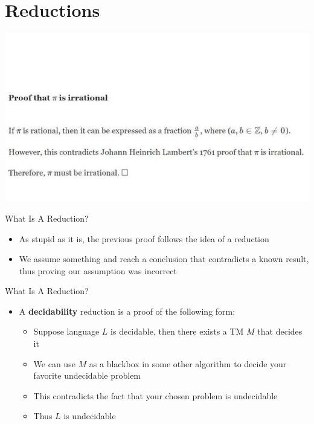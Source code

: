 \documentclass[aspectratio=169]{beamer}
\begin{document}
\section{Reductions}
\frame{\sectionpage}

\begin{frame}
  \begin{center}
    \includegraphics[width=\textwidth]{images/pi_proof.jpg}
  \end{center}
\end{frame}

\begin{frame}{What Is A Reduction?}
    \begin{itemize}
        \item As stupid as it is, the previous proof follows the idea of a reduction \pause
        \item We assume something and reach a conclusion that contradicts a known result, thus proving our assumption was incorrect
    \end{itemize}
\end{frame}

\begin{frame}{What Is A Reduction?}
    \begin{itemize}
        \item A \textbf{decidability} reduction is a proof of the following form: \pause
        \begin{itemize}
            \item Suppose language $L$ is decidable, then there exists a TM $M$ that decides it \pause
            \item We can use $M$ as a blackbox in some other algorithm to decide your favorite undecidable problem \pause
            \item This contradicts the fact that your chosen problem is undecidable \pause
            \item Thus $L$ is undecidable
        \end{itemize}
    \end{itemize}
\end{frame}
\end{document}
